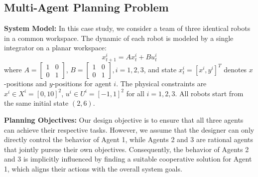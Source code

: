 \documentclass[letterpaper, 10 pt, conference]{ieeeconf}
\begin{document}
\subsection{Multi-Agent Planning Problem}\label{sec-multi}
{\bf System Model: }
In this case study, we consider a team of three identical robots  in a common workspace. 
The dynamic of each robot is modeled by a single integrator on a planar workspace: 
\begin{equation}
    x^i_{t+1}= A x^i_t + B u^i_t \nonumber
\end{equation}
where $A=       \left[
                    \begin{array}{cccc}
                         1 & 0 \\
                         0 & 1 
                    \end{array}
                \right]$,
    $B =        \left[
                    \begin{array}{cc}
                         1 & 0  \\
                         0 & 1 
                    \end{array}
                \right],i=1, 2, 3$,  
and state $x_t^i=[x^i, y^i]^T$ denotes $x$-positions and $y$-positions for agent $i$.  
The physical constraints are $x^i\in X^i=[0,10]^2$, $u^i\in U^i=[-1,1]^2$ for all $i= 1,2,3$. 
All  robots start from the same initial state $(2,6)$.

{\bf Planning Objectives: } 
Our design objective is to ensure that all three agents can achieve their respective tasks. However, we assume that the designer can only directly control the behavior of Agent 1, while Agents 2 and 3 are rational agents that jointly pursue their own objectives. Consequently, the behavior of Agents 2 and 3 is implicitly influenced by finding a suitable cooperative solution for Agent 1, which aligns their actions with the overall system goals.  
\end{document}
